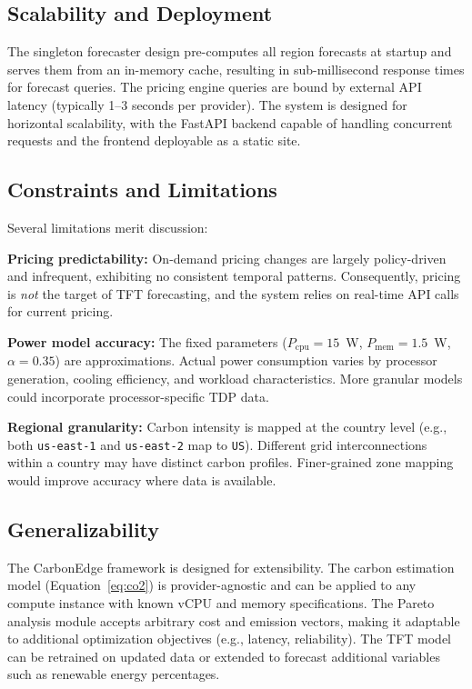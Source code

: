 \documentclass[conference]{IEEEtran}
\begin{document}
\subsection{Scalability and Deployment}

The singleton forecaster design pre-computes all region forecasts at startup and serves them from an in-memory cache, resulting in sub-millisecond response times for forecast queries. The pricing engine queries are bound by external API latency (typically 1--3 seconds per provider). The system is designed for horizontal scalability, with the FastAPI backend capable of handling concurrent requests and the frontend deployable as a static site.

\subsection{Constraints and Limitations}

Several limitations merit discussion:

\textbf{Pricing predictability:} On-demand pricing changes are largely policy-driven and infrequent, exhibiting no consistent temporal patterns. Consequently, pricing is \textit{not} the target of TFT forecasting, and the system relies on real-time API calls for current pricing.

\textbf{Power model accuracy:} The fixed parameters ($P_{\text{cpu}} = 15$~W, $P_{\text{mem}} = 1.5$~W, $\alpha = 0.35$) are approximations. Actual power consumption varies by processor generation, cooling efficiency, and workload characteristics. More granular models could incorporate processor-specific TDP data.

\textbf{Regional granularity:} Carbon intensity is mapped at the country level (e.g., both \texttt{us-east-1} and \texttt{us-east-2} map to \texttt{US}). Different grid interconnections within a country may have distinct carbon profiles. Finer-grained zone mapping would improve accuracy where data is available.


\subsection{Generalizability}

The CarbonEdge framework is designed for extensibility. The carbon estimation model (Equation~\ref{eq:co2}) is provider-agnostic and can be applied to any compute instance with known vCPU and memory specifications. The Pareto analysis module accepts arbitrary cost and emission vectors, making it adaptable to additional optimization objectives (e.g., latency, reliability). The TFT model can be retrained on updated data or extended to forecast additional variables such as renewable energy percentages.
\end{document}
